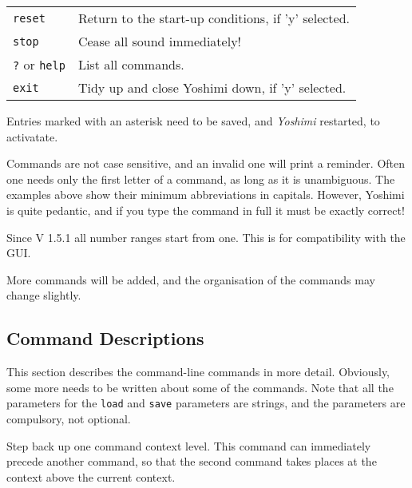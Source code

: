 \begin{table}[H]
\begin{tabular}{l l}
         \texttt{reset} &
            Return to the start-up conditions, if 'y' selected. \\

         \texttt{stop} &
            Cease all sound immediately! \\

         \texttt{?} or \texttt{help} &
            List all commands. \\

         \texttt{exit} &
            Tidy up and close Yoshimi down, if 'y' selected. \\

      \end{tabular}
   \end{table}

   Entries marked with an asterisk need to be saved, and \textsl{Yoshimi}
   restarted, to activatate.

   Commands are not case sensitive, and an invalid one will print a reminder.
   Often one needs only the first letter of a command, as long as it is
   unambiguous. The examples above show their minimum abbreviations in capitals.
   However, Yoshimi is quite pedantic, and if you type the command in full it
   must be exactly correct!

   Since V 1.5.1 all number ranges start from one. This is for compatibility
   with the GUI.

   More commands will be added, and the organisation of the commands
   may change slightly.

\fi


\subsection{Command Descriptions}
\label{subsec:command_line_command_descriptions}

   This section describes the command-line commands in more detail.
   Obviously, some more needs to be written about some of the commands.
   Note that all the parameters for the \texttt{load} and \texttt{save}
   parameters are strings, and the parameters are compulsory, not optional.

   \setcounter{ItemCounter}{0}      %

      Step back up one command context level.
      This command can immediately precede another command, so that the second
      command takes places at the context above the current context.

